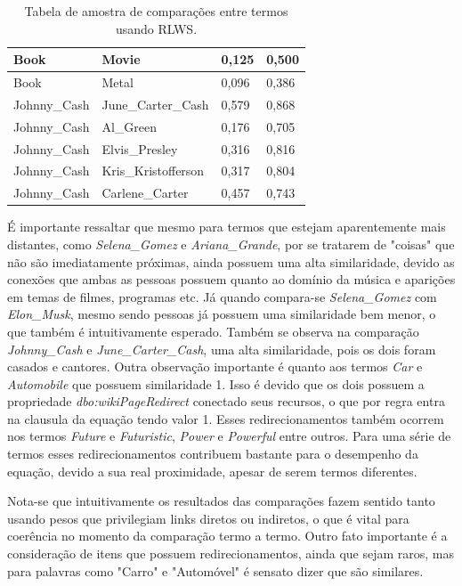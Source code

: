 \begin{table}[H]
\begin{tabular}{|l|l|l|l|}
Book             & Movie               & 0,125                   & 0,500                   \\ \hline
Book             & Metal               & 0,096                   & 0,386                   \\ \hline
Johnny\_Cash     & June\_Carter\_Cash  & 0,579                   & 0,868                   \\ \hline
Johnny\_Cash     & Al\_Green           & 0,176                   & 0,705                   \\ \hline
Johnny\_Cash     & Elvis\_Presley      & 0,316                   & 0,816                   \\ \hline
Johnny\_Cash     & Kris\_Kristofferson & 0,317                   & 0,804                   \\ \hline
Johnny\_Cash     & Carlene\_Carter     & 0,457                   & 0,743                   \\ \hline
\end{tabular}
\caption{Tabela de amostra de comparações entre termos usando \ac{RLWS}.}
\label{tab:rlws_results}
\end{table}

É importante ressaltar que mesmo para termos que estejam aparentemente mais distantes, como \textit{Selena\_Gomez} e \textit{Ariana\_Grande}, por se tratarem de "coisas" que não são imediatamente próximas, ainda possuem uma alta similaridade, devido as conexões que ambas as pessoas possuem quanto ao domínio da música e aparições em temas de filmes, programas etc. Já quando compara-se \textit{Selena\_Gomez} com \textit{Elon\_Musk}, mesmo sendo pessoas já possuem uma similaridade bem menor, o que também é intuitivamente esperado. Também se observa na comparação \textit{Johnny\_Cash} e \textit{June\_Carter\_Cash}, uma alta similaridade, pois os dois foram casados e cantores. Outra observação importante é quanto aos termos \textit{Car} e \textit{Automobile} que possuem similaridade 1. Isso é devido que os dois possuem a propriedade \textit{dbo:wikiPageRedirect} conectado seus recursos, o que por regra entra na clausula da equação tendo valor 1. Esses redirecionamentos também ocorrem nos  termos \textit{Future} e \textit{Futuristic}, \textit{Power} e \textit{Powerful} entre outros. Para uma série de termos esses redirecionamentos contribuem bastante para o desempenho da equação, devido a sua real proximidade, apesar de serem termos diferentes.

Nota-se que intuitivamente os resultados das comparações fazem sentido tanto usando pesos que privilegiam links diretos ou indiretos, o que é vital para coerência no momento da comparação termo a termo. Outro fato importante é a consideração de itens que possuem redirecionamentos, ainda que sejam raros, mas para palavras como "Carro" e "Automóvel" é sensato dizer que são similares.

